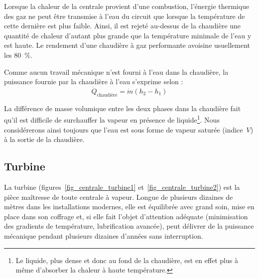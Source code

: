 		Lorsque la chaleur de la centrale provient d’une combustion, l’énergie thermique des gaz ne peut être transmise à l’eau du circuit que lorsque la température de cette dernière est plus faible. Ainsi, il est rejeté au-dessus de la chaudière une quantité de chaleur d’autant plus grande que la température minimale de l’eau y est haute. Le rendement d’une chaudière à gaz performante avoisine usuellement les \SI{80}{\percent}.

		Comme aucun travail mécanique n’est fourni à l’eau dans la chaudière, la puissance fournie par la chaudière à l’eau s’exprime selon :
		\begin{equation}
			\dot{Q}_\text{chaudière} = \dot{m} (h_2 - h_1)
		\end{equation}

		La différence de masse volumique entre les deux phases dans la chaudière fait qu’il est difficile de surchauffer la vapeur en présence de liquide\footnote{Le liquide, plus dense et donc au fond de la chaudière, est en effet plus à même d’absorber la chaleur à haute température.}\nolinebreak.
		Nous considérerons ainsi toujours que l’eau est sous forme de vapeur saturée (indice~$V$) à la sortie de la chaudière.

	\subsection{Turbine}

		La turbine (figures~\ref{fig_centrale_turbine1} et~\ref{fig_centrale_turbine2}) est la pièce maîtresse de toute centrale à vapeur. Longue de plusieurs dizaines de mètres dans les installations modernes, elle est équilibrée avec grand soin, mise en place dans son coffrage et, si elle fait l’objet d’attention adéquate (minimisation des gradients de température, lubrification avancée), peut délivrer de la puissance mécanique pendant plusieurs dizaines d’années sans interruption.

